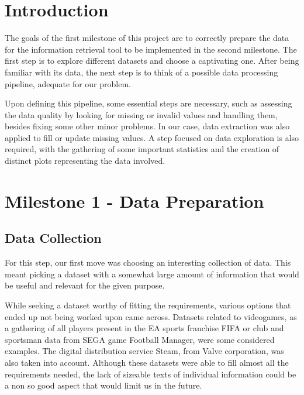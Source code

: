 \documentclass[sigplan,screen]{acmart}
\begin{document}
\maketitle

\section{Introduction}

The goals of the first milestone of this project are to correctly prepare the data for the information retrieval tool to be implemented in the second milestone. The first step is to explore different datasets and choose a captivating one. After being familiar with its data, the next step is to think of a possible data processing pipeline, adequate for our problem.

Upon defining this pipeline, some essential steps are necessary, such as assessing the data quality by looking for missing or invalid values and handling them, besides fixing some other minor problems. In our case, data extraction was also applied to fill or update missing values. A step focused on data exploration is also required, with the gathering of some important statistics and the creation of distinct plots representing the data involved.

\section{Milestone 1 - Data Preparation}

\subsection{Data Collection}

For this step, our first move was choosing an interesting collection of data. This meant picking a dataset with a somewhat large amount of information that would be useful and relevant for the given purpose.

While seeking a dataset worthy of fitting the requirements, various options that ended up not being worked upon came across. Datasets related to videogames, as a gathering of all players present in the EA sports franchise FIFA or club and sportsman data from SEGA game Football Manager, were some considered examples. The digital distribution service Steam, from Valve corporation, was also taken into account. Although these datasets were able to fill almost all the requirements needed, the lack of sizeable texts of individual information could be a non so good aspect that would limit us in the future.
\end{document}
